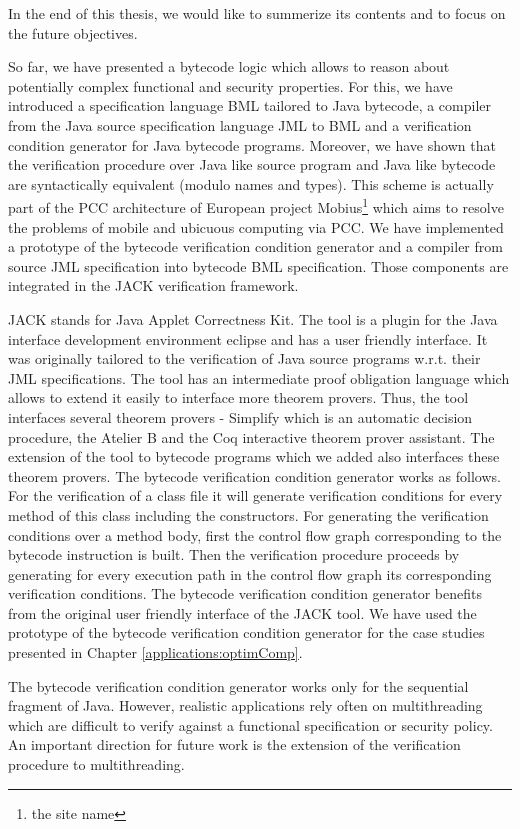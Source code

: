 
In the end of this thesis, we would like to summerize 
its contents and to focus on the future objectives. 

So far, we have  presented a bytecode logic which allows to reason about potentially
complex  functional and security properties.
 For this, we have 
introduced a specification language BML tailored to Java bytecode, a compiler
from the Java source specification language JML to BML and a verification 
condition generator for Java bytecode programs. Moreover, we have
shown that the verification procedure over Java like source program
and Java like bytecode are syntactically equivalent (modulo names and types). 
This scheme is actually part of the PCC architecture of 
European project Mobius\footnote{the site name} which aims to resolve the problems
of mobile and ubicuous computing via PCC. 
We have implemented a prototype of the bytecode verification condition generator and a compiler 
from source JML specification into bytecode BML specification. Those components are integrated in the JACK verification framework. 

JACK stands for Java Applet Correctness Kit. The tool is a plugin for the Java interface development
 environment eclipse and has a user friendly interface. It was originally tailored to the verification of Java source programs 
w.r.t. their JML specifications. The tool has an intermediate proof obligation language which allows to extend it easily to interface more 
 theorem provers. Thus, the tool interfaces several theorem provers - Simplify which is an automatic decision procedure, the Atelier B and the Coq interactive
theorem prover assistant. The extension of the tool to bytecode programs which we added also interfaces these theorem provers. The bytecode 
verification condition generator works as follows. For the verification of a class file it will generate verification conditions for every
 method of this class including the constructors. For generating the verification conditions over a method body, first the control flow
 graph corresponding to the bytecode instruction is built.
 Then the verification procedure proceeds by generating for every execution path in the control flow graph its corresponding verification conditions.
The bytecode verification condition generator benefits from the original user friendly interface of the JACK tool. 
We have used the prototype of the bytecode verification condition generator for the case studies presented in Chapter \ref{applications:optimComp}.

The bytecode verification condition generator works only for the sequential fragment of Java. However, realistic applications 
rely often on multithreading which are difficult to verify against a functional specification or security policy.
 An important direction for future work is the extension of the verification procedure to multithreading. 

